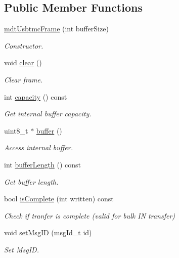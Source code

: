 \subsection*{Public Member Functions}
\begin{DoxyCompactItemize}
\item 
\hyperlink{classmdt_usbtmc_frame_a13c13f990d680f6f6469b6497a99ba9b}{mdt\-Usbtmc\-Frame} (int buffer\-Size)
\begin{DoxyCompactList}\small\item\em Constructor. \end{DoxyCompactList}\item 
void \hyperlink{classmdt_usbtmc_frame_a7319ff2fffb9f1c65b4c43343b82b473}{clear} ()
\begin{DoxyCompactList}\small\item\em Clear frame. \end{DoxyCompactList}\item 
int \hyperlink{classmdt_usbtmc_frame_a5dd70d38f6ac1dde01cd239683059484}{capacity} () const 
\begin{DoxyCompactList}\small\item\em Get internal buffer capacity. \end{DoxyCompactList}\item 
uint8\-\_\-t $\ast$ \hyperlink{classmdt_usbtmc_frame_a687e2e2cac399ce6d51359d7ad10a304}{buffer} ()
\begin{DoxyCompactList}\small\item\em Access internal buffer. \end{DoxyCompactList}\item 
int \hyperlink{classmdt_usbtmc_frame_ae6e3bf44c22c868d476c30177cfa4ec7}{buffer\-Length} () const 
\begin{DoxyCompactList}\small\item\em Get buffer length. \end{DoxyCompactList}\item 
bool \hyperlink{classmdt_usbtmc_frame_a9f62664b9dcf56a7666b3ea23a715075}{is\-Complete} (int written) const 
\begin{DoxyCompactList}\small\item\em Check if tranfer is complete (valid for bulk I\-N transfer) \end{DoxyCompactList}\item 
void \hyperlink{classmdt_usbtmc_frame_addeba40f6ea48d960a7cf1e80f409c77}{set\-Msg\-I\-D} (\hyperlink{classmdt_usbtmc_frame_abf1e449c264011341c477d45eb700c42}{msg\-Id\-\_\-t} id)
\begin{DoxyCompactList}\small\item\em Set Msg\-I\-D. \end{DoxyCompactList}\item 

\end{DoxyCompactItemize}
